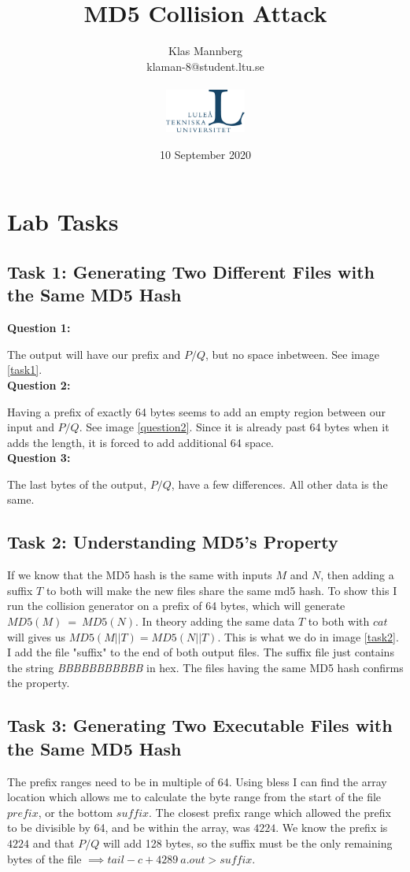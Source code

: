 \documentclass[a4paper]{article}
\title{MD5 Collision Attack}
\author{
Klas Mannberg \\
{klaman-8@student.ltu.se
} \\ \\
\includegraphics[width=0.2\textwidth]{ltu_swe.jpg}}
\date{10 September 2020}
\begin{document}
\maketitle


\tableofcontents


\section{Lab Tasks}
\subsection{Task 1: Generating Two Different Files with the Same MD5 Hash}
\textbf{Question 1:}

The output will have our prefix and $P/Q$, but no space inbetween. See image \ref{task1}.\\
\textbf{Question 2:}


Having a prefix of exactly 64 bytes seems to add an empty region between our input and $P/Q$. See image \ref{question2}. Since it is already past 64 bytes when it adds the length, it is forced to add additional 64 space.\\
\textbf{Question 3: }

The last bytes of the output, $P/Q$, have a few differences. All other data is the same. \\
\subsection{Task 2: Understanding MD5’s Property}
If we know that the MD5 hash is the same with inputs $M$ and $N$, then adding a suffix $T$ to both will make the new files share the same md5 hash.
To show this I run the collision generator on a prefix of 64 bytes, which will generate $MD5(M)\:=\:MD5(N)$. In theory adding the same data $T$ to both with $cat$ will gives us $MD5(M || T) = MD5(N || T)$. This is what we do in image \ref{task2}. I add the file "suffix" to the end of both output files. The suffix file just contains the string \textit{BBBBBBBBBBB} in hex. The files having the same MD5 hash confirms the property.
\subsection{Task 3: Generating Two Executable Files with the Same MD5 Hash} \label{section:3}
The prefix ranges need to be in multiple of 64. Using bless I can find the array location which allows me to calculate the byte range from the start of the file $prefix$, or the bottom $suffix$. The closest prefix range which allowed the prefix to be divisible by 64, and be within the array, was $4224$. We know the prefix is $4224$ and that $P/Q$ will add 128 bytes, so the suffix must be the only remaining bytes of the file $\implies tail -c +4289\:a.out > suffix$.
\end{document}
